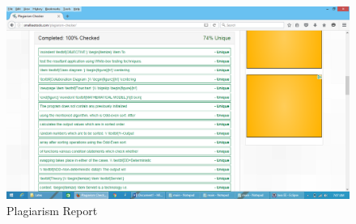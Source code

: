 \documentclass[a4paper,12pt]{article}
\begin{document}
\begin{figure}[htb!]
	\centering
	\includegraphics[scale = 0.80]{b2_oddeven.png}
	\caption{Plagiarism Report }
	\label{Plagiarism Report}
\end{figure}
\end{document}
